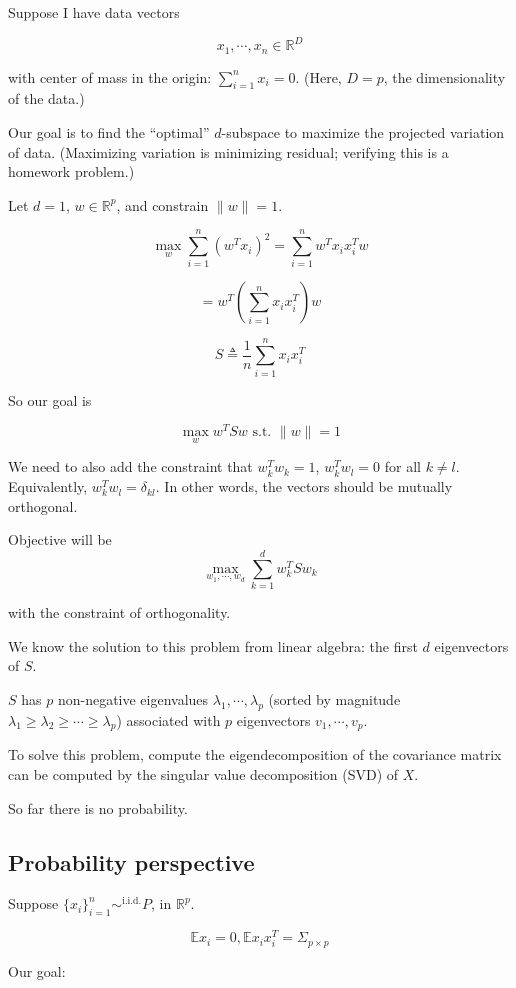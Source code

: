 \documentclass[12pt]{article}
\theoremstyle{plain}
\begin{document}
Suppose I have data vectors

$$ x_1, \cdots, x_n \in \mathbb{R}^D $$

with center of mass in the origin: $\sum_{i=1}^n x_i = 0$. (Here, $D = p$, the dimensionality of the data.)

Our goal is to find the ``optimal'' $d$-subspace to maximize the projected variation of data. (Maximizing variation is minimizing residual; verifying this is a homework problem.)

Let $d=1$, $w \in \mathbb{R}^p$, and constrain $\|w \| = 1$.

$$ \max_w \sum_{i=1}^n (w^T x_i)^2  = \sum_{i=1}^n w^T x_i x_i^T w $$

$$ = w^T (\sum_{i=1}^n x_i x_i^T) w $$

$$ S \triangleq \frac{1}{n} \sum_{i=1}^n x_i x_i^T$$

So our goal is

$$ \max_w w^T S w \text{ s.t. } \| w \| = 1 $$

We need to also add the constraint that $w_k^T w_k = 1$, $w_k^T w_l = 0$ for all $k \neq l$. Equivalently, $w_k^T w_l = \delta_{kl}$. In other words, the vectors should be mutually orthogonal.

Objective will be $$\max_{w_1, \cdots, w_d}  \sum_{k=1}^d w_k^T S w_k$$

with the constraint of orthogonality.

We know the solution to this problem from linear algebra: the first $d$ eigenvectors of $S$.

$S$ has $p$ non-negative eigenvalues $\lambda_1, \cdots, \lambda_p$ (sorted by magnitude $\lambda_1 \geq \lambda_2 \geq \cdots \geq \lambda_p$) associated with $p$ eigenvectors $v_1, \cdots, v_p$.

To solve this problem, compute the eigendecomposition of the covariance matrix can be computed by the singular value decomposition (SVD) of $X$.

So far there is no probability.

\subsection*{Probability perspective}

Suppose $\{x_i \}_{i=1}^n \sim^{\text{i.i.d.}} P$, in $\mathbb{R}^p$.

$$ \mathbb{E} x_i = 0, \mathbb{E} x_i x_i^T = \Sigma_{p \times p} $$

Our goal:
\end{document}
